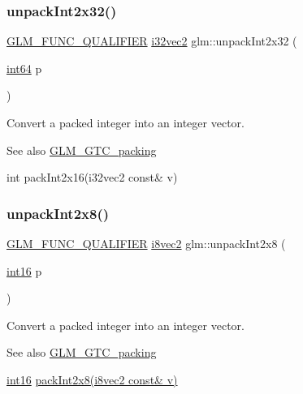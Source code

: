 \subsubsection{\texorpdfstring{unpack\+Int2x32()}{unpackInt2x32()}}
{\footnotesize\ttfamily \hyperlink{setup_8hpp_a33fdea6f91c5f834105f7415e2a64407}{G\+L\+M\+\_\+\+F\+U\+N\+C\+\_\+\+Q\+U\+A\+L\+I\+F\+I\+ER} \hyperlink{group__gtc__type__precision_ga99191e0de942ecc1df32d522f8064789}{i32vec2} glm\+::unpack\+Int2x32 (\begin{DoxyParamCaption}\item[{\hyperlink{group__gtc__type__precision_ga435d75819cce297cc5fa21bd84ef89a5}{int64}}]{p }\end{DoxyParamCaption})}

Convert a packed integer into an integer vector.

\begin{DoxySeeAlso}{See also}
\hyperlink{group__gtc__packing}{G\+L\+M\+\_\+\+G\+T\+C\+\_\+packing} 

int pack\+Int2x16(i32vec2 const\& v) 
\end{DoxySeeAlso}
\mbox{\label{group__gtc__packing_ga55b4670bffab6ddb39d4a0fbf98718c1}} 
\subsubsection{\texorpdfstring{unpack\+Int2x8()}{unpackInt2x8()}}
{\footnotesize\ttfamily \hyperlink{setup_8hpp_a33fdea6f91c5f834105f7415e2a64407}{G\+L\+M\+\_\+\+F\+U\+N\+C\+\_\+\+Q\+U\+A\+L\+I\+F\+I\+ER} \hyperlink{group__gtc__type__precision_gade57e4b55fe2b2345a4f2ac2b149cd32}{i8vec2} glm\+::unpack\+Int2x8 (\begin{DoxyParamCaption}\item[{\hyperlink{group__gtc__type__precision_ga2945a61d12771f8954994fcddf02b021}{int16}}]{p }\end{DoxyParamCaption})}

Convert a packed integer into an integer vector.

\begin{DoxySeeAlso}{See also}
\hyperlink{group__gtc__packing}{G\+L\+M\+\_\+\+G\+T\+C\+\_\+packing} 

\hyperlink{group__gtc__type__precision_ga2945a61d12771f8954994fcddf02b021}{int16} \hyperlink{group__gtc__packing_ga532b06d8915c6c65649f828e9106a1d9}{pack\+Int2x8(i8vec2 const\& v)} 
\end{DoxySeeAlso}
\mbox{\label{group__gtc__packing_ga625619888b95299a1ee0d9e50469c482}} 
